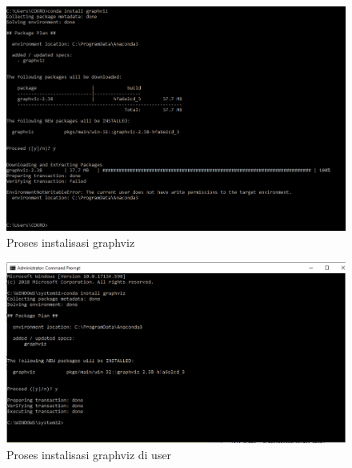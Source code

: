 \begin{enumerate}
\begin{figure}[ht]
      \centerline{\includegraphics[width=1\textwidth]
      {figures/cokro/c32}}
      \caption{Proses instalisasi  graphviz }
      \label{c32}
     \end{figure}

\begin{figure}[ht]
      \centerline{\includegraphics[width=1\textwidth]
      {figures/cokro/c33}}
      \caption{Proses instalisasi  graphviz di user }
      \label{c33}
     \end{figure}


\end{enumerate}
